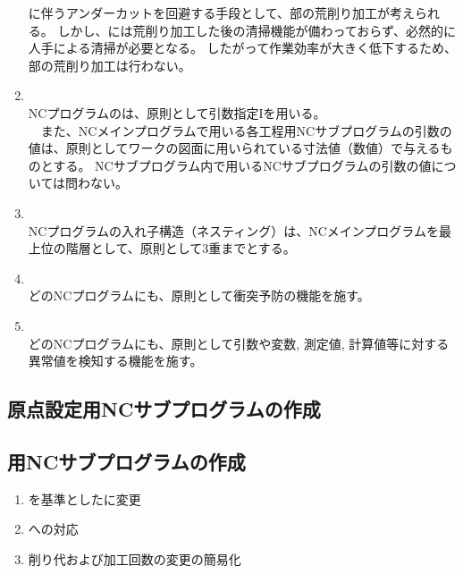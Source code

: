 \begin{enumerate}[label*=\alph*)]
\DimpleMilling に伴うアンダーカットを回避する手段として、\EndFace 部の荒削り加工が考えられる。
しかし、\DMC には荒削り加工した後の清掃機能が備わっておらず、必然的に人手による清掃が必要となる。
したがって作業効率が大きく低下するため、\EndFace 部の荒削り加工は行わない。
\item {}\\
NCプログラムのは、原則として引数指定Iを用いる。\\
　また、NCメインプログラムで用いる各工程用NCサブプログラムの引数の値は、原則としてワークの図面に用いられている寸法値（数値）で与えるものとする。
NCサブプログラム内で用いるNCサブプログラムの引数の値については問わない。
\item {}\\
NCプログラムの入れ子構造（ネスティング）は、NCメインプログラムを最上位の階層として、原則として3重までとする。
\item {}\\
どのNCプログラムにも、原則として衝突予防の機能を施す。
\item {}\\
どのNCプログラムにも、原則として引数や変数, 測定値, 計算値等に対する異常値を検知する機能を施す。
\end{enumerate}


\clearpage
\subsection{原点設定用NCサブプログラムの作成\TBW}


\subsection{\EndFacecutMilling 用NCサブプログラムの作成\TBW}
\begin{enumerate}[label=\sarrow]
\item \IDCenter を基準とした\EndFacecutMilling に変更
\item \ODCornerR への対応
\item {}削り代および加工回数の変更の簡易化
\end{enumerate}


